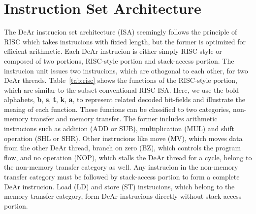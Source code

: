     \section{Instruction Set Architecture}
    \indent The DeAr instrucion set architecture (ISA) seemingly follows the principle of RISC which takes instrucions with fixied length, 
    but the former is optimized for efficient arithmetic.
    Each DeAr instrucion is either simply RISC-style or composed of two portions, RISC-style portion and stack-access portion.
    The instrucion unit issues two instrucions, which are othogonal to each other, for two DeAr threads.
    Table~\ref{tab:risc} shows the functions of the RISC-style portion, which are similar to the subset conventional RISC ISA.
    Here, we use the bold alphabets, \textbf{b}, \textbf{s}, \textbf{t}, \textbf{k}, \textbf{a}, 
    to represent related decoded bit-fields and illustrate the meaing of each function.
    These funcions can be classified to two categories, non-memory transfer and memory transfer.
    The former includes arithmetic instrucions such as addition (ADD or SUB), multiplication (MUL) and shift operation (SHL or SHR).
    Other instrucions like move (MV), which moves data from the other DeAr thread, branch on zero (BZ), which controls the program flow, 
    and no operation (NOP), which stalls the DeAr thread for a cycle, belong to the non-memory transfer category as well.
    Any instrucion in the non-memory transfer category must be followed by stack-access portion to form a complete DeAr instrucion.
    Load (LD) and store (ST) instrucions, which belong to the memory transfer category, 
    form DeAr instrucions directly without stack-access portion.
